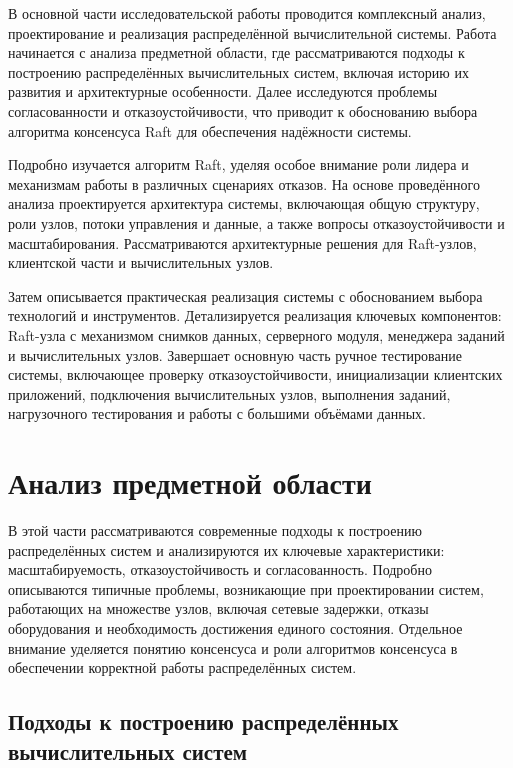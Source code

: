 
В основной части исследовательской работы проводится комплексный анализ,
проектирование и реализация распределённой вычислительной системы. Работа
начинается с анализа предметной области, где рассматриваются подходы к
построению распределённых вычислительных систем, включая историю их развития и
архитектурные особенности. Далее исследуются проблемы согласованности и
отказоустойчивости, что приводит к обоснованию выбора алгоритма консенсуса Raft
для обеспечения надёжности системы.

Подробно изучается алгоритм Raft, уделяя особое внимание роли лидера и
механизмам работы в различных сценариях отказов. На основе проведённого анализа
проектируется архитектура системы, включающая общую структуру, роли узлов,
потоки управления и данные, а также вопросы отказоустойчивости и
масштабирования. Рассматриваются архитектурные решения для Raft-узлов,
клиентской части и вычислительных узлов.

Затем описывается практическая реализация системы с обоснованием выбора
технологий и инструментов. Детализируется реализация ключевых компонентов:
Raft-узла с механизмом снимков данных, серверного модуля, менеджера
заданий и вычислительных узлов. Завершает основную часть ручное тестирование
системы, включающее проверку отказоустойчивости, инициализации клиентских
приложений, подключения вычислительных узлов, выполнения заданий, нагрузочного
тестирования и работы с большими объёмами данных.

\section{Анализ предметной области}

В этой части рассматриваются современные подходы к построению распределённых
систем и анализируются их ключевые характеристики: масштабируемость,
отказоустойчивость и согласованность. Подробно описываются типичные проблемы,
возникающие при проектировании систем, работающих на множестве узлов, включая
сетевые задержки, отказы оборудования и необходимость достижения единого
состояния. Отдельное внимание уделяется понятию консенсуса и роли алгоритмов
консенсуса в обеспечении корректной работы распределённых систем.

\subsection{Подходы к построению распределённых вычислительных систем}

